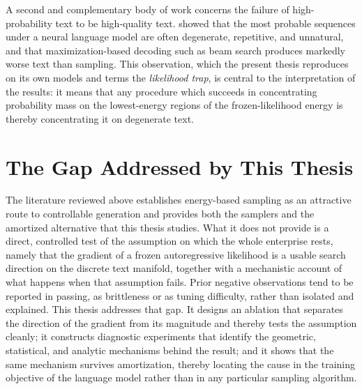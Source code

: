 A second and complementary body of work concerns the failure of high-probability text to be high-quality text. \citet{holtzman2020curious} showed that the most probable sequences under a neural language model are often degenerate, repetitive, and unnatural, and that maximization-based decoding such as beam search produces markedly worse text than sampling. This observation, which the present thesis reproduces on its own models and terms the \emph{likelihood trap}, is central to the interpretation of the results: it means that any procedure which succeeds in concentrating probability mass on the lowest-energy regions of the frozen-likelihood energy is thereby concentrating it on degenerate text.

\section{The Gap Addressed by This Thesis}
\label{sec:rel-gap}

The literature reviewed above establishes energy-based sampling as an attractive route to controllable generation and provides both the samplers and the amortized alternative that this thesis studies. What it does not provide is a direct, controlled test of the assumption on which the whole enterprise rests, namely that the gradient of a frozen autoregressive likelihood is a usable search direction on the discrete text manifold, together with a mechanistic account of what happens when that assumption fails. Prior negative observations tend to be reported in passing, as brittleness or as tuning difficulty, rather than isolated and explained. This thesis addresses that gap. It designs an ablation that separates the direction of the gradient from its magnitude and thereby tests the assumption cleanly; it constructs diagnostic experiments that identify the geometric, statistical, and analytic mechanisms behind the result; and it shows that the same mechanism survives amortization, thereby locating the cause in the training objective of the language model rather than in any particular sampling algorithm.
